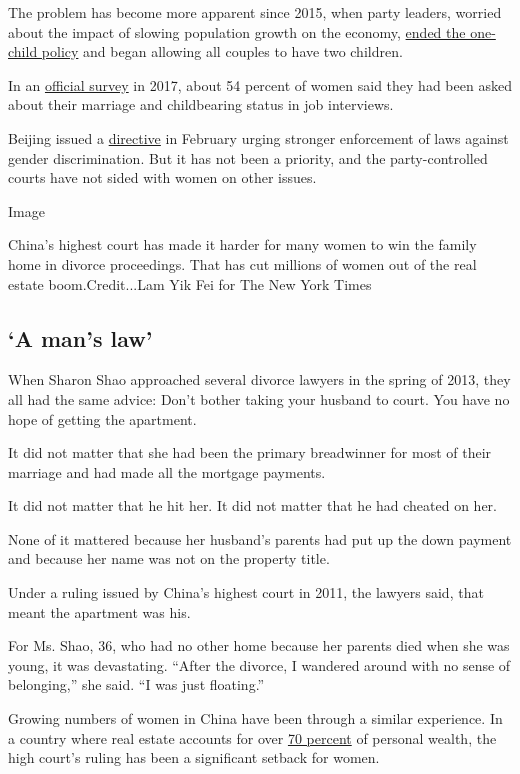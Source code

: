 The problem has become more apparent since 2015, when party leaders,
worried about the impact of slowing population growth on the economy,
\href{https://www.nytimes.com/2015/10/30/world/asia/china-end-one-child-policy.html}{ended
the one-child policy} and began allowing all couples to have two
children.

In an \href{http://www.wsic.ac.cn/academicnews/90644.htm}{official
survey} in 2017, about 54 percent of women said they had been asked
about their marriage and childbearing status in job interviews.

Beijing issued a
\href{https://www.nytimes.com/2019/02/21/world/china-gender-discrimination-workplace.html}{directive}
in February urging stronger enforcement of laws against gender
discrimination. But it has not been a priority, and the party-controlled
courts have not sided with women on other issues.

Image

China's highest court has made it harder for many women to win the
family home in divorce proceedings. That has cut millions of women out
of the real estate boom.Credit...Lam Yik Fei for The New York Times

\hypertarget{a-mans-law}{%
\subsection{`A man's law'}\label{a-mans-law}}

When Sharon Shao approached several divorce lawyers in the spring of
2013, they all had the same advice: Don't bother taking your husband to
court. You have no hope of getting the apartment.

It did not matter that she had been the primary breadwinner for most of
their marriage and had made all the mortgage payments.

It did not matter that he hit her. It did not matter that he had cheated
on her.

None of it mattered because her husband's parents had put up the down
payment and because her name was not on the property title.

Under a ruling issued by China's highest court in 2011, the lawyers
said, that meant the apartment was his.

For Ms. Shao, 36, who had no other home because her parents died when
she was young, it was devastating. ``After the divorce, I wandered
around with no sense of belonging,'' she said. ``I was just floating.''

Growing numbers of women in China have been through a similar
experience. In a country where real estate accounts for over
\href{https://www.ncbi.nlm.nih.gov/pmc/articles/PMC4589866/}{70 percent}
of personal wealth, the high court's ruling has been a significant
setback for women.

